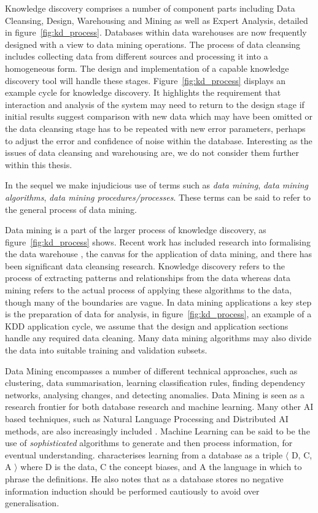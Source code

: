 \medskip
Knowledge discovery comprises a number of component parts including
Data Cleansing, Design, Warehousing and Mining as well as Expert
Analysis, detailed in figure~\ref{fig:kd_process}. Databases within
data warehouses are now frequently designed with a view to data mining
operations. The process of data cleansing includes collecting data
from different sources and processing it into a homogeneous form. The
design and implementation of a capable knowledge discovery tool will handle
these stages. Figure~\ref{fig:kd_process} displays an example cycle
for knowledge discovery. It highlights the requirement that
interaction and analysis of the system may need to return to the
design stage if initial results suggest comparison with new data which
may have been omitted or the data cleansing stage has to be repeated
with new error parameters, perhaps to adjust the error and confidence
of noise within the database.  Interesting as the issues of data
cleansing and warehousing are, we do not consider them further within
this thesis.
\medskip

In the sequel we make injudicious use of terms such as {\em data
mining}, {\em data mining algorithms}, {\em data mining
procedures/processes}. These terms can be said to refer to the general
process of data mining. 

\medskip

Data mining is a part of the larger process of knowledge discovery, as
figure~\ref{fig:kd_process} shows. Recent work has included
research into formalising the data warehouse \cite{hgmw95,inm96a}, the canvas for
the application of data mining, and there has been significant
data cleansing research.  Knowledge
discovery refers to the process of extracting patterns and relationships 
from the data whereas data mining refers to the actual process of applying
these algorithms to the data, though many of the boundaries are vague.
In data mining applications a key step is 
the preparation of data for analysis, in figure~\ref{fig:kd_process},
an example of a KDD application cycle, we assume that the
design and application sections handle any required data
cleaning. Many data mining algorithms may also divide the data into suitable training and validation subsets.

Data Mining encompasses a number of different
technical approaches, such as clustering, data summarisation, learning
classification rules, finding dependency networks, analysing changes,
and detecting anomalies.  Data Mining is seen as a research frontier
for both database research and machine learning. Many other AI based techniques, such as Natural Language 
Processing and Distributed AI methods, are also increasingly included
\cite{kdd96}.  Machine Learning can be said to be the use of {\em
sophisticated} algorithms to generate and then process information,
for eventual understanding. \cite{xiao95} characterises learning from a
database as a triple $\langle$ D, C, A $\rangle$ where 
D is the data, C the concept biases, and A the language in which to
phrase the definitions. He also notes that as a database stores no  
negative information induction should be performed cautiously to avoid
over generalisation.
\medskip

